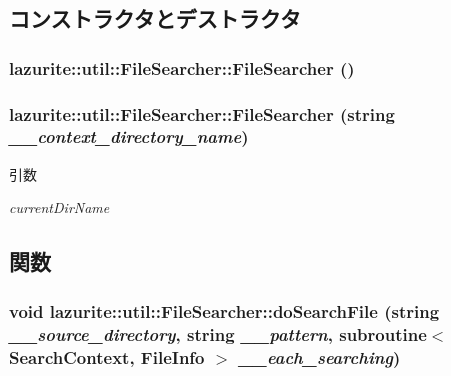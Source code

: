 \subsection{コンストラクタとデストラクタ}
\hypertarget{classlazurite_1_1util_1_1_file_searcher_a8b7b2ad0f76b7d0ea29242f4f3c1672d}{
\subsubsection[{FileSearcher}]{\setlength{\rightskip}{0pt plus 5cm}lazurite::util::FileSearcher::FileSearcher ()}}
\label{classlazurite_1_1util_1_1_file_searcher_a8b7b2ad0f76b7d0ea29242f4f3c1672d}
\hypertarget{classlazurite_1_1util_1_1_file_searcher_a5652c03915ddc186e4694d182f267500}{
\subsubsection[{FileSearcher}]{\setlength{\rightskip}{0pt plus 5cm}lazurite::util::FileSearcher::FileSearcher (string {\em \_\-\_\-context\_\-directory\_\-name})}}
\label{classlazurite_1_1util_1_1_file_searcher_a5652c03915ddc186e4694d182f267500}

\begin{DoxyParams}{引数}
\item[{\em currentDirName}]\end{DoxyParams}


\subsection{関数}
\hypertarget{classlazurite_1_1util_1_1_file_searcher_a6f0edc6095593e8cded48afbe2f442fa}{
\subsubsection[{doSearchFile}]{\setlength{\rightskip}{0pt plus 5cm}void lazurite::util::FileSearcher::doSearchFile (string {\em \_\-\_\-source\_\-directory}, \/  string {\em \_\-\_\-pattern}, \/  subroutine$<$ {\bf SearchContext}, FileInfo $>$ {\em \_\-\_\-each\_\-searching})}}
\label{classlazurite_1_1util_1_1_file_searcher_a6f0edc6095593e8cded48afbe2f442fa}

